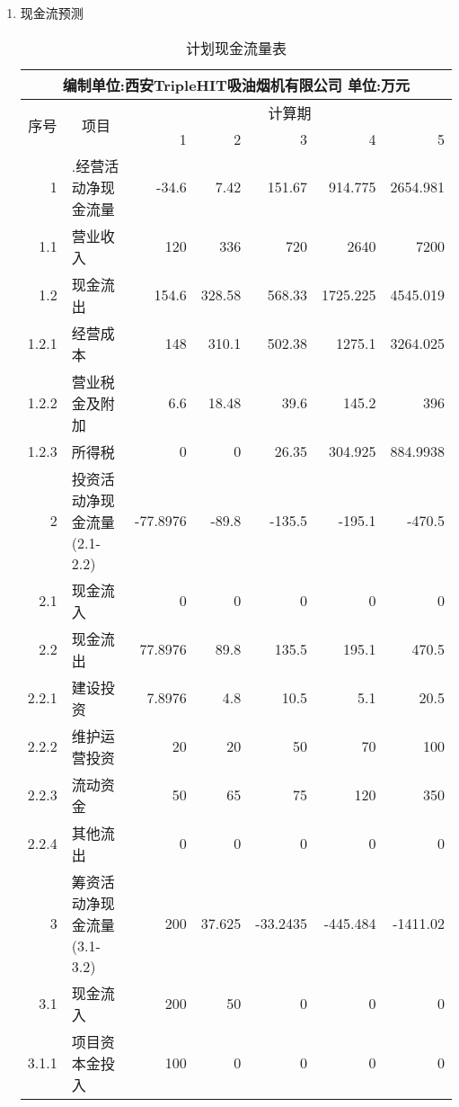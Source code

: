 \begin{enumerate}
\newpage
\item 现金流预测

      \begin{table}[H]
      \centering
      \caption{计划现金流量表}
      \begin{tabular}{|rlrrrrr|}
      \toprule
      \multicolumn{7}{c}{编制单位:西安TripleHIT吸油烟机有限公司                             单位:万元} \\
      \hline
      \multicolumn{1}{c}{\multirow{2}[0]{*}{序号}} & \multicolumn{1}{c}{\multirow{2}[0]{*}{项目}} & \multicolumn{5}{c}{计算期} \\
            &       & 1     & 2     & 3     & 4     & 5 \\
      \hline
      1     & .经营活动净现金流量 & -34.6 & 7.42  & 151.67 & 914.775 & 2654.981 \\
      1.1   & 营业收入  & 120   & 336   & 720   & 2640  & 7200 \\
      1.2   & 现金流出  & 154.6 & 328.58 & 568.33 & 1725.225 & 4545.019 \\
      \multicolumn{1}{l}{1.2.1} & 经营成本  & 148   & 310.1 & 502.38 & 1275.1 & 3264.025 \\
      \multicolumn{1}{l}{1.2.2} & 营业税金及附加 & 6.6   & 18.48 & 39.6  & 145.2 & 396 \\
      \multicolumn{1}{l}{1.2.3} & 所得税   & 0     & 0     & 26.35 & 304.925 & 884.9938 \\
      2     & 投资活动净现金流量(2.1-2.2) & -77.8976 & -89.8 & -135.5 & -195.1 & -470.5 \\
      2.1   & 现金流入  & 0     & 0     & 0     & 0     & 0 \\
      2.2   & 现金流出  & 77.8976 & 89.8  & 135.5 & 195.1 & 470.5 \\
      \multicolumn{1}{l}{2.2.1} & 建设投资  & 7.8976 & 4.8   & 10.5  & 5.1   & 20.5 \\
      \multicolumn{1}{l}{2.2.2} & 维护运营投资 & 20    & 20    & 50    & 70    & 100 \\
      \multicolumn{1}{l}{2.2.3} & 流动资金  & 50    & 65    & 75    & 120   & 350 \\
      \multicolumn{1}{l}{2.2.4} & 其他流出  & 0     & 0     & 0     & 0     & 0 \\
      3     & 筹资活动净现金流量(3.1-3.2) & 200   & 37.625 & -33.2435 & -445.484 & -1411.02 \\
      3.1   & 现金流入  & 200   & 50    & 0     & 0     & 0 \\
      \multicolumn{1}{l}{3.1.1} & 项目资本金投入 & 100   & 0     & 0     & 0     & 0 \\

\end{tabular}
\end{table}
\end{enumerate}
